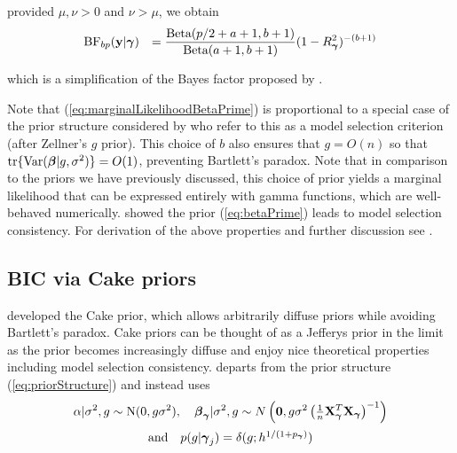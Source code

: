 \noindent provided $\mu,\nu>0$ and $\nu>\mu$, we obtain
\begin{equation}\label{eq:marginalLikelihoodBetaPrime}
	\begin{array}{rl}
		\displaystyle \mbox{BF}_{bp}({\bf y}|{\boldsymbol \gamma}) 
		& \displaystyle 
		=   
		\frac{\mbox{Beta}(p/2 + a + 1,b + 1)}{\mbox{Beta}(a+1,b+1)} (1-R_{\boldsymbol \gamma}^2)^{-(b + 1)}
	\end{array}
\end{equation}

\noindent which is a simplification of the Bayes factor proposed by
\cite{Maruyama2011}.


Note that (\ref{eq:marginalLikelihoodBetaPrime}) is proportional to a special
case of the prior structure considered by \cite{Maruyama2011} who refer to this
as a model selection criterion (after Zellner's $g$ prior). This choice of $b$
also ensures that $g = O(n)$ so that $\mbox{tr}\{\mbox{Var}({\boldsymbol \beta} | g,
\sigma^2)\} = O(1)$, preventing Bartlett's paradox. 
Note that in comparison to the priors we have previously discussed, this choice
of prior yields a marginal likelihood that can be expressed entirely with gamma
functions, which are well-behaved numerically.  \cite{Maruyama2011} showed the
prior (\ref{eq:betaPrime}) leads to model selection consistency.  For
derivation of the above properties and further discussion see
\cite{Maruyama2011}.

\subsection{BIC via Cake priors}  

\noindent
\cite{OrmerodEtal2017} developed the Cake prior, which allows arbitrarily
diffuse priors while avoiding Bartlett's paradox.  Cake priors can be thought
of as a Jefferys prior in the limit as the prior becomes increasingly diffuse
and enjoy nice theoretical properties including model selection consistency.
\cite{OrmerodEtal2017} departs from the prior structure
(\ref{eq:priorStructure}) and instead uses
\begin{equation}\label{eq:proirs2}
\begin{array}{c}
	\displaystyle \alpha|\sigma^2,g \sim \text{N}(0,g\sigma^2), \quad 
	\displaystyle {\boldsymbol\beta}_{\boldsymbol \gamma}|\sigma^2,g \sim N\left( {\bf 0},g\sigma^2\left( \tfrac{1}{n}{\bf X}_{\boldsymbol \gamma}^T{\bf X}_{\boldsymbol \gamma}\right)^{-1}\right) \\ [2ex]
	\mbox{and} \quad
	p(g|{\boldsymbol \gamma}_j) = \delta(g; h^{1/(1 + p_{\boldsymbol \gamma})})
\end{array} 
\end{equation}


